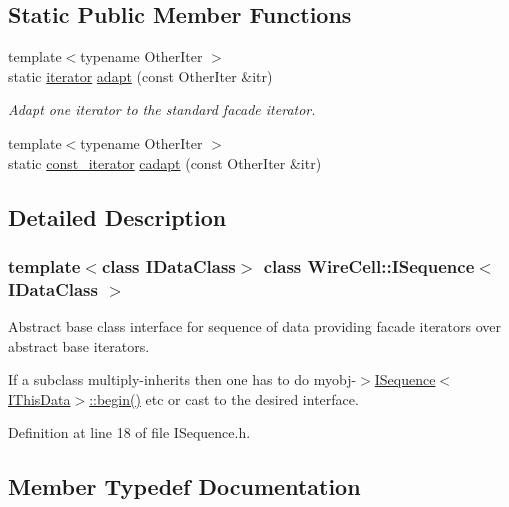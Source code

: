 \subsection*{Static Public Member Functions}
\begin{DoxyCompactItemize}
\item 
{\footnotesize template$<$typename Other\+Iter $>$ }\\static \hyperlink{class_wire_cell_1_1_i_sequence_ac9bcf643972944d21c90743d9281f47a}{iterator} \hyperlink{class_wire_cell_1_1_i_sequence_a0049905d5140aca88b0ef1fdf5ecc2ac}{adapt} (const Other\+Iter \&itr)
\begin{DoxyCompactList}\small\item\em Adapt one iterator to the standard facade iterator. \end{DoxyCompactList}\item 
{\footnotesize template$<$typename Other\+Iter $>$ }\\static \hyperlink{class_wire_cell_1_1_i_sequence_a70e983c18db65df4337838592fa9fd9d}{const\+\_\+iterator} \hyperlink{class_wire_cell_1_1_i_sequence_a14e5cb0b4dbac2c6aa82ee4734ce6b90}{cadapt} (const Other\+Iter \&itr)
\end{DoxyCompactItemize}


\subsection{Detailed Description}
\subsubsection*{template$<$class I\+Data\+Class$>$\newline
class Wire\+Cell\+::\+I\+Sequence$<$ I\+Data\+Class $>$}

Abstract base class interface for sequence of data providing facade iterators over abstract base iterators.

If a subclass multiply-\/inherits then one has to do myobj-\/$>$\hyperlink{class_wire_cell_1_1_i_sequence_a03153c2cdc4d34c0feca9b214d4ed2a8}{I\+Sequence$<$\+I\+This\+Data$>$\+::begin()} etc or cast to the desired interface. 

Definition at line 18 of file I\+Sequence.\+h.



\subsection{Member Typedef Documentation}
\mbox{\label{class_wire_cell_1_1_i_sequence_af99d3e9815ec440bd96ca06a6e65f26c}} 
